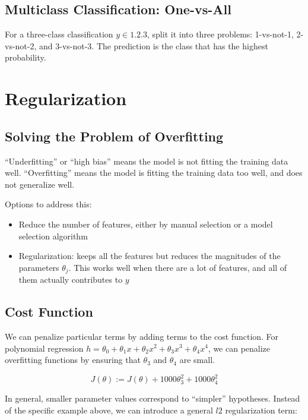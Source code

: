 \subsection{Multiclass Classification: One-vs-All}

For a three-class classification $y \in \qty{1, 2, 3}$,
split it into three problems: 1-vs-not-1, 2-vs-not-2, and 3-vs-not-3.
The prediction is the class that has the highest probability.

\section{Regularization}

\subsection{Solving the Problem of Overfitting}

``Underfitting'' or ``high bias'' means the model is not fitting the training data well.
``Overfitting'' means the model is fitting the training data too well, and does not generalize well.

Options to address this:

\begin{itemize}
  \item Reduce the number of features, either by manual selection 
    or a model selection algorithm
  \item Regularization: keeps all the features but reduces the
    magnitudes of the parameters $\theta_j$.  This works well when
    there are a lot of features, and all of them actually contributes to $y$
\end{itemize}

\subsection{Cost Function}

We can penalize particular terms by adding terms to the cost function.
For polynomial regression 
$h = \theta_0 + \theta_1 x + \theta_2 x^2 + \theta_3 x^3 + \theta_4 x^4$,
we can penalize overfitting functions by ensuring that 
$\theta_3$ and $\theta_4$ are small.

\[ J(\theta) := J(\theta) + 1000 \theta_3^2 + 1000 \theta_4^2 \]

In general, smaller parameter values correspond to ``simpler'' hypotheses.
Instead of the specific example above, we can introduce a general $l2$ regularization term:

